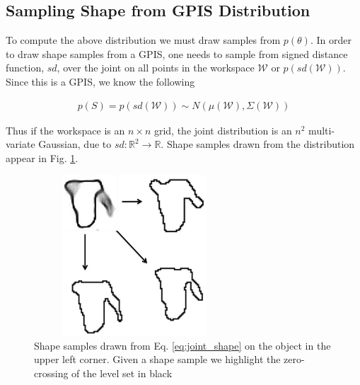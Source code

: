 \documentclass[letterpaper, 10 pt, conference]{ieeeconf}  %
\begin{document}
\subsection{Sampling Shape from GPIS Distribution }
To compute the above distribution we must draw samples from $p(\theta)$. In order to draw shape samples from a GPIS, one needs to sample from signed distance function, $sd$, over the joint on all points in the workspace $\mathcal{W}$ or $p(sd(\mathcal{W}))$. Since this is a GPIS, we know the following 

\vspace{-2ex}
\begin{align}\label{eq:joint_shape}
p(S) = p(sd(\mathcal{W})) \sim N(\mu(\mathcal{W}),\Sigma(\mathcal{W}))
\end{align}

Thus if the workspace is an $n \times n$ grid, the joint distribution is an  $n^2$ multi-variate Gaussian, due to $sd:\mathbb{R}^2 \rightarrow \mathbb{R}$.  Shape samples drawn from the distribution appear in Fig. \ref{fig:shape_samples}.


\begin{figure}[ht!]
\centering
\includegraphics[width = 7.5cm, height= 6cm ]{figures/Slide13.jpg}
\caption{Shape samples drawn from Eq. \ref{eq:joint_shape} on the object in the upper left corner. Given a shape sample we highlight the zero-crossing of the level set in black}
\vspace*{-10pt}
\label{fig:shape_samples}
\end{figure}
\end{document}
